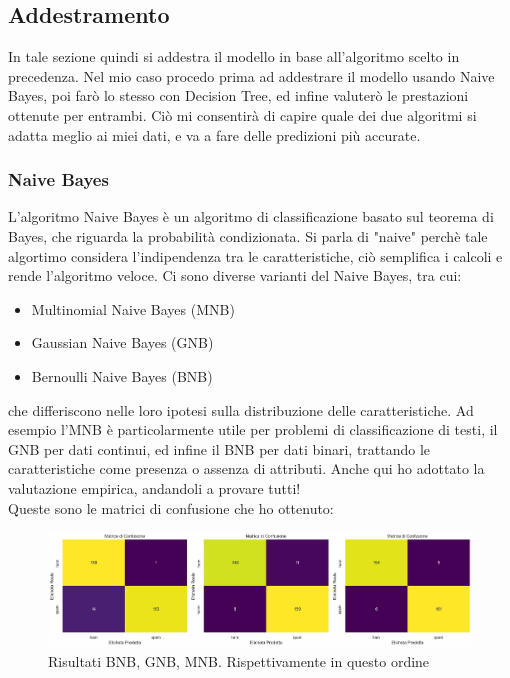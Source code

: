 \documentclass[]{article}
\begin{document}
            \subsection{Addestramento}
                In tale sezione quindi si addestra il modello in base all'algoritmo scelto in precedenza. Nel mio caso procedo prima ad addestrare il modello usando Naive Bayes, poi farò lo stesso con Decision Tree, ed infine valuterò le prestazioni ottenute per entrambi. Ciò mi consentirà di capire quale dei due algoritmi si adatta meglio ai miei dati, e va a fare delle predizioni più accurate.\\

                \subsubsection{Naive Bayes}
                    L'algoritmo Naive Bayes è un algoritmo di classificazione basato sul teorema di Bayes, che riguarda la probabilità condizionata. Si parla di  "naive" perchè tale algortimo considera l'indipendenza tra le caratteristiche, ciò semplifica i calcoli e rende l'algoritmo veloce. Ci sono diverse varianti del Naive Bayes, tra cui:
                    \begin{itemize}
                        \item Multinomial Naive Bayes (MNB)
                        \item  Gaussian Naive Bayes (GNB)
                        \item Bernoulli Naive Bayes (BNB)
                    \end{itemize}
                    che differiscono nelle loro ipotesi sulla distribuzione delle caratteristiche. Ad esempio l'MNB è particolarmente utile per problemi di classificazione di testi, il GNB per dati continui, ed infine il BNB per dati binari, trattando le caratteristiche come presenza o assenza di attributi. Anche qui ho adottato la valutazione empirica, andandoli a provare tutti! \\
                    Queste sono le matrici di confusione che ho ottenuto:
                    \begin{figure}[H]
                        \centering
                        \includegraphics[width=1.1\linewidth]{images/NaiveBayesResult.jpg}
                        \caption{Risultati BNB, GNB, MNB. Rispettivamente in questo ordine}
                        \label{fig:enter-label}
                    \end{figure}
\end{document}
